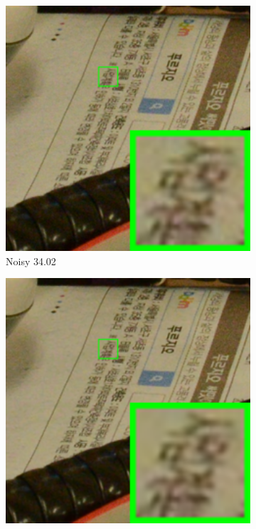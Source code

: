 \begin{figure}
    \centering
    \begin{subfigure}[t]{0.19\textwidth}
        \centering
        \includegraphics[width=1\textwidth]{images/guided/cc60/resize_br_Noisy_CC_Noisy_Nikon_D800_ISO_3200_A1_111.png}
		\caption{Noisy 34.02}
    \end{subfigure}
    \hfill
    \begin{subfigure}[t]{0.19\textwidth}
        \centering
        \includegraphics[width=1\textwidth]{images/guided/cc60/resize_br_CBM3D_CC_Noisy_Nikon_D800_ISO_3200_A1_111.png}

\end{subfigure}
\end{figure}
